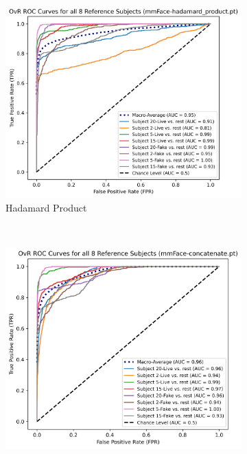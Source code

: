 \documentclass{mpaper}
\begin{document}
\begin{figure}[t!]
    \centering
    \begin{subfigure}[b]{0.325\textwidth}
        \includegraphics[width=1.082\textwidth]{figures/roc_hadamard_product.png}
        \caption{Hadamard Product}
        \label{fig:roc_hadamard_product}
    \end{subfigure}
    ~\hspace{0.001cm}
    \begin{subfigure}[b]{0.315\textwidth}
        \includegraphics[width=1.065\textwidth]{figures/roc_concatenate.png}

\end{subfigure}
\end{figure}
\end{document}
